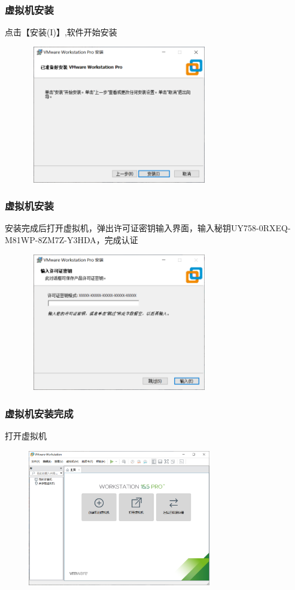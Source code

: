 \documentclass[notheorems,serif]{beamer}
\begin{document}
\begin{frame}
\frametitle{虚拟机安装}
点击【安装(I)】,软件开始安装
\begin{figure}
\centering
\includegraphics[width=8cm,height=6cm]{./figures/图片6.png}
\end{figure}
\end{frame}

\begin{frame}
\frametitle{虚拟机安装}
 安装完成后打开虚拟机，弹出许可证密钥输入界面，输入秘钥UY758-0RXEQ-M81WP-8ZM7Z-Y3HDA，完成认证
\begin{figure}
 \centering
 \includegraphics[width=8cm,height=6cm]{./figures/图片7.png}
\end{figure}
\end{frame}

\begin{frame}
\frametitle{虚拟机安装完成}
 打开虚拟机
\begin{figure}
 \centering
 \includegraphics[width=8cm,height=6cm]{./figures/图片8.png}
\end{figure}
\end{frame}
\end{document}
